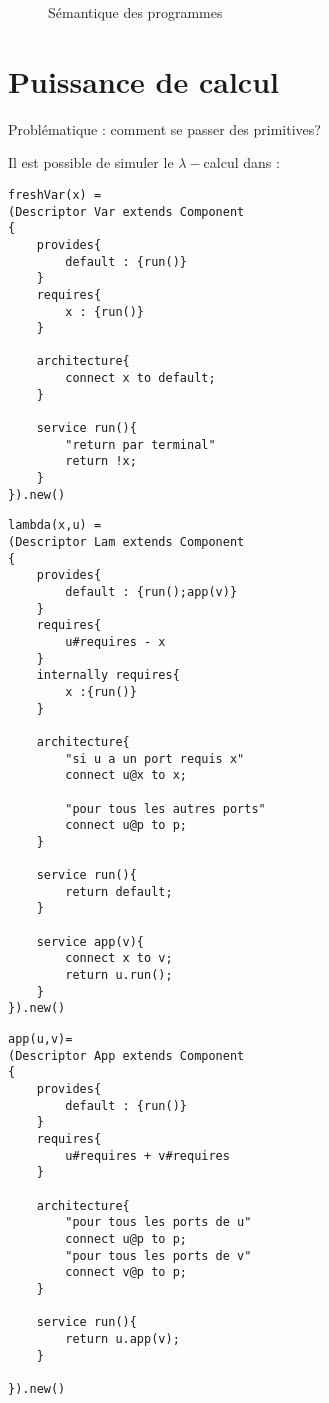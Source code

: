 \begin{figure}[ht!]
{{}}
\caption{Sémantique des programmes}


\label{fig:semexpr}
\end{figure}



\chapter{Puissance de calcul}
Problématique : comment se passer des primitives?

Il est possible de simuler le $\lambda -$calcul dans \compo : 
\begin{lstlisting}[caption = Variable]
freshVar(x) = 
(Descriptor Var extends Component
{
	provides{
		default : {run()}
	}
	requires{
		x : {run()}
	}
	
	architecture{
		connect x to default;
	}
	
	service run(){
		"return par terminal"
		return !x;
	}	
}).new()

\end{lstlisting}


\begin{lstlisting}[caption=$\lambda-$abstraction]
lambda(x,u) = 
(Descriptor Lam extends Component
{
	provides{
		default : {run();app(v)}
	}
	requires{
		u#requires - x
	}
	internally requires{
		x :{run()}
	}
	
	architecture{
		"si u a un port requis x"
		connect u@x to x;
		
		"pour tous les autres ports"
		connect u@p to p;
	}
	
	service run(){
		return default;
	}
	
	service app(v){
		connect x to v;
		return u.run();
	}
}).new()
\end{lstlisting}

\begin{lstlisting}[caption = Application]
app(u,v)=
(Descriptor App extends Component
{
	provides{
		default : {run()}
	}
	requires{
		u#requires + v#requires
	}
	
	architecture{		
		"pour tous les ports de u"
		connect u@p to p;
		"pour tous les ports de v"
		connect v@p to p;
	}
	
	service run(){
		return u.app(v);
	}
	
}).new()
\end{lstlisting}





